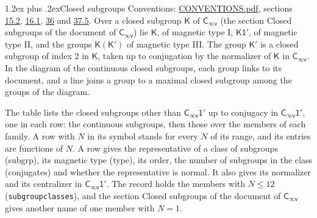 \documentclass[10pt,a4paper]{article}
\makeatletter
\renewcommand\section{\@startsection{section}{1}{\z@}{-3ex plus -1ex minus -.2ex}%
  {1.2ex plus .2ex}{\normalfont\large\sffamily\bfseries\color{parttitle}}}
\numberwithin{equation}{section}
\newcommand{\grp}[1]{\mathsf{#1}}
\makeatother
\begin{document}
\section{Closed subgroups}\label{s:subgroups}
Conventions: \href{../../CONVENTIONS.pdf}{CONVENTIONS.pdf}, sections \href{../../../rotation/CONVENTIONS.pdf\#conv.15.2}{15.2}, \href{../../../rotation/CONVENTIONS.pdf\#conv.16.1}{16.1}, \href{../../CONVENTIONS.pdf\#conv.36}{36} and \href{../../CONVENTIONS.pdf\#conv.37.5}{37.5}.
\leavevmode\label{n:group.subgroup.point}Over a closed subgroup $\grp{K}$ of $\grp{C_{\infty v}}$ (the section Closed subgroups of the document of \href{../../../rotation/data/pdf/Cinfv.pdf}{$\grp{C_{\infty v}}$}) lie $\grp{K}$, of magnetic type I, $\grp{K1'}$, of magnetic type II, and the groups $\grp{K}(\grp{K}')$ of magnetic type III. The group $\grp{K}'$ is a closed subgroup of index 2 in $\grp{K}$, taken up to conjugation by the normalizer of $\grp{K}$ in $\grp{C_{\infty v}}$. In the diagram of the continuous closed subgroups, each group links to its document, and a line joins a group to a maximal closed subgroup among the groups of the diagram.
\begin{center}\end{center}
The table lists the closed subgroups other than $\grp{C_{\infty v}1'}$ up to conjugacy in $\grp{C_{\infty v}1'}$, one in each row: the continuous subgroups, then those over the members of each family. \label{n:index.family.N}A row with $N$ in its symbol stands for every $N$ of its range, and its entries are functions of $N$. \label{n:head.subgroup}\label{n:head.magnetic.type}\label{n:head.order}\label{n:head.conjugates}\label{n:head.normal}A row gives the representative of a class of subgroups (subgrp), its magnetic type (type), its order, the number of subgroups in the class (conjugates) and whether the representative is normal. \label{n:head.normalizer}\label{n:head.centralizer}It also gives its normalizer and its centralizer in $\grp{C_{\infty v}1'}$. The record holds the members with $N \le 12$ (\texttt{subgroupclasses}), and the section Closed subgroups of the document of \href{../../../rotation/data/pdf/Cinfv.pdf}{$\grp{C_{\infty v}}$} gives another name of one member with $N = 1$.
\end{document}
